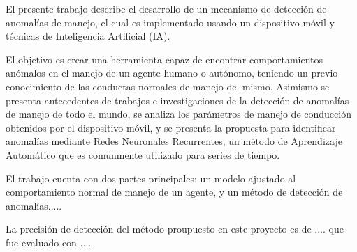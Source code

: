 El presente trabajo describe el desarrollo de un mecanismo de detecci\'{o}n de anomal\'{i}as de manejo, el cual es implementado usando un dispositivo m\'{o}vil y t\'{e}cnicas de Inteligencia Artificial (IA). 

El objetivo es crear una herramienta capaz de encontrar comportamientos an\'{o}malos en el manejo de un agente humano o aut\'{o}nomo, teniendo un previo conocimiento de las conductas normales de manejo del mismo. Asimismo se presenta antecedentes de trabajos e investigaciones de la detecci\'{o}n de anomal\'{i}as de manejo de todo el mundo, se analiza los par\'{a}metros de manejo de conducci\'{o}n obtenidos por el dispositivo m\'{o}vil, y se presenta la propuesta para identificar anomal\'{i}as mediante Redes Neuronales Recurrentes, un m\'{e}todo de Aprendizaje Autom\'{a}tico que es comunmente utilizado para series de tiempo.

El trabajo cuenta con dos partes principales: un modelo ajustado al comportamiento normal de manejo de un agente, y un m\'{e}todo de detecci\'{o}n de anomal\'{i}as.....

La precisi\'{o}n de detecci\'{o}n del m\'{e}todo proupuesto en este proyecto es de .... que fue evaluado con .... 





